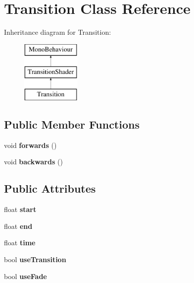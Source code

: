 \hypertarget{class_transition}{\section{Transition Class Reference}
\label{class_transition}
}
Inheritance diagram for Transition\-:\begin{figure}[H]
\begin{center}
\leavevmode
\includegraphics[height=3.000000cm]{class_transition}
\end{center}
\end{figure}
\subsection*{Public Member Functions}
\begin{DoxyCompactItemize}
\item 
\hypertarget{class_transition_af952690a90e0fa9e87f31ccb9f8e15e0}{void {\bfseries forwards} ()}\label{class_transition_af952690a90e0fa9e87f31ccb9f8e15e0}

\item 
\hypertarget{class_transition_a355b09e04439c9c2e5c2cb41183057af}{void {\bfseries backwards} ()}\label{class_transition_a355b09e04439c9c2e5c2cb41183057af}

\end{DoxyCompactItemize}
\subsection*{Public Attributes}
\begin{DoxyCompactItemize}
\item 
\hypertarget{class_transition_a51032520a65cb2ef2b5436b874aee39f}{float {\bfseries start}}\label{class_transition_a51032520a65cb2ef2b5436b874aee39f}

\item 
\hypertarget{class_transition_a960afdae6e8871c31b095b19399dc74c}{float {\bfseries end}}\label{class_transition_a960afdae6e8871c31b095b19399dc74c}

\item 
\hypertarget{class_transition_a0eb1c5ad8ef7e837e4cc3ff3d0b3a0f9}{float {\bfseries time}}\label{class_transition_a0eb1c5ad8ef7e837e4cc3ff3d0b3a0f9}

\item 
\hypertarget{class_transition_afeb8e3e45338d8adc3455c06f88d5707}{bool {\bfseries use\-Transition}}\label{class_transition_afeb8e3e45338d8adc3455c06f88d5707}

\item 
\hypertarget{class_transition_a0101ba46e561d3104b22a7fa8a5242f7}{bool {\bfseries use\-Fade}}\label{class_transition_a0101ba46e561d3104b22a7fa8a5242f7}

\end{DoxyCompactItemize}
